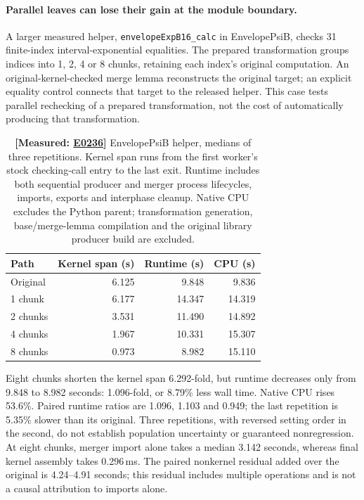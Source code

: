 \documentclass[10pt,twocolumn]{article}
\newcommand{\measured}[1]{\textbf{[Measured: #1]}}
\newcommand{\expref}[2]{\href{https://github.com/yunwei37/proofserve/blob/main/docs/tmp/build-and-evaluate/step-#1/step-report.md}{E#2}}
\begin{document}
\paragraph{Parallel leaves can lose their gain at the module boundary.}
A larger measured helper, \texttt{envelopeExpB16\_calc} in
EnvelopePsiB, checks 31 finite-index interval-exponential equalities.
The prepared transformation groups indices into 1, 2, 4 or 8 chunks,
retaining each index's original computation.
An original-kernel-checked merge lemma reconstructs the original target;
an explicit equality control connects that target to the released helper.
This case tests parallel rechecking of a prepared transformation, not the
cost of automatically producing that transformation.

\begin{table}[t]
\centering\small\setlength{\tabcolsep}{3pt}
\begin{tabular}{lrrr}
\toprule
Path & Kernel span (s) & Runtime (s) & CPU (s)\\
\midrule
Original &6.125&9.848&9.836\\
1 chunk &6.177&14.347&14.319\\
2 chunks &3.531&11.490&14.892\\
4 chunks &1.967&10.331&15.307\\
8 chunks &0.973&8.982&15.110\\
\bottomrule
\end{tabular}
\caption{\measured{\expref{0236-20261101T051231+0000}{0236}} EnvelopePsiB helper, medians of three repetitions. Kernel span
runs from the first worker's stock checking-call entry to the last exit.
Runtime includes both sequential producer and merger process lifecycles,
imports, exports and interphase cleanup. Native CPU excludes the Python
parent; transformation generation, base/merge-lemma compilation and the
original library producer build are excluded.}
\label{tab:envelope}
\end{table}

Eight chunks shorten the kernel span 6.292-fold, but runtime decreases
only from 9.848 to 8.982 seconds: 1.096-fold, or 8.79\% less wall time.
Native CPU rises 53.6\%.
Paired runtime ratios are 1.096, 1.103 and 0.949; the last repetition
is 5.35\% slower than its original.
Three repetitions, with reversed setting order in the second, do not
establish population uncertainty or guaranteed nonregression.
At eight chunks, merger import alone takes a median 3.142 seconds,
whereas final kernel assembly takes 0.296\,ms.
The paired nonkernel residual added over the original is 4.24--4.91
seconds; this residual includes multiple operations and is not a causal
attribution to imports alone.
\end{document}
